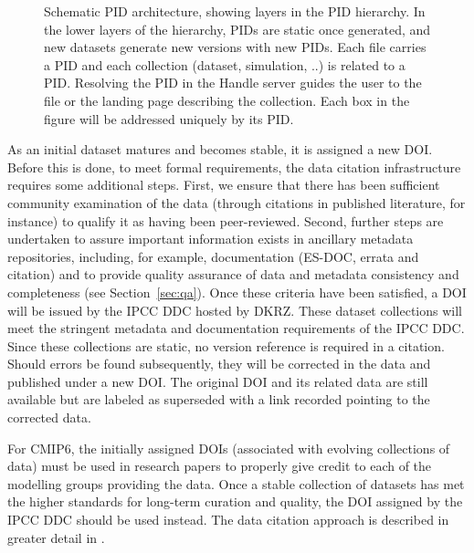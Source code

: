 \documentclass[gmd,manuscript]{copernicus}
\begin{document}
\begin{figure*}
  \begin{center}
  \end{center}
  \caption{Schematic PID architecture, showing layers in the PID
    hierarchy. In the lower layers of the hierarchy, PIDs are static
    once generated, and new datasets generate new versions with new
    PIDs. Each file carries a PID and each collection (dataset,
    simulation, ..) is related to a PID. Resolving the PID in the
    Handle server guides the user to the file or the landing page
    describing the collection. Each box in the figure will be
    addressed uniquely by its PID.}
  \label{fig:pidarch}
\end{figure*}

As an initial dataset matures and becomes stable, it is assigned a new
DOI. Before this is done, to meet formal requirements, the data citation infrastructure
requires some additional steps.  First, we
ensure that there has been sufficient community examination of the
data
(through citations in published literature, for instance) to qualify
it as having been peer-reviewed. Second, further steps are undertaken
to assure important information exists in ancillary metadata
repositories, including, for example, documentation (ES-DOC, errata
and citation) and to provide quality assurance of data and metadata
consistency and completeness (see Section~\ref{sec:qa}). Once these
criteria have been satisfied, a DOI will be issued by the IPCC DDC
hosted by DKRZ. These dataset collections will meet the stringent
metadata and documentation requirements of the IPCC DDC. Since these
collections are static, no version reference is required in a
citation.
Should errors be found subsequently, they will be corrected in the
data and published under a new DOI. The original DOI and its related
data are still available but are labeled as superseded with a link recorded
pointing to the corrected data.

For CMIP6, the initially assigned DOIs (associated with evolving
collections of data) must be used in research papers to properly give
credit to each of the modelling groups providing the data. Once a
stable collection of datasets has met the higher standards for
long-term curation and quality, the DOI assigned by the IPCC DDC
should be used instead.
The data citation approach is described in greater detail in \cite{ref:stockhauselautenschlager2017}.
\end{document}
